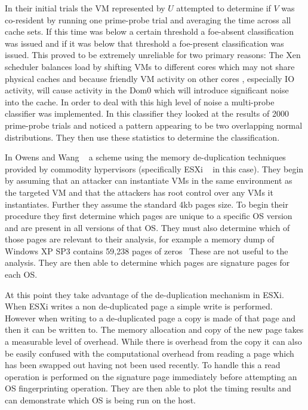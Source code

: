In their initial trials the VM represented by $U$ attempted to determine if $V$ was co-resident by running one prime-probe trial and averaging the time across all cache sets. If this time was below a certain threshold a foe-absent classification was issued and if it was below that threshold a foe-present classification was issued. This proved to be extremely unreliable for two primary reasons: The Xen scheduler balances load by shifting VMs to different cores which may not share physical caches and because friendly VM activity on other cores , especially IO activity, will cause activity in the Dom0 which will introduce significant noise into the cache. In order to deal with this high level of noise a multi-probe classifier was implemented. In this classifier they looked at the results of 2000 prime-probe trials and noticed a pattern appearing to be two overlapping normal distributions. They then use these statistics to determine the classification. 

In Owens and Wang ~\cite{owens_non-interactive_2011} a scheme using the memory de-duplication techniques provided by commodity hypervisors (specifically ESXi ~\cite{chaubal_architecture_2008} in this case). They begin by assuming that an attacker can instantiate VMs in the same environment as the targeted VM and that the attackers has root control over any VMs it instantiates. Further they assume the standard 4kb pages size. To begin their procedure they first determine which pages are unique to a specific OS version and are present in all versions of that OS. They must also determine which of those pages are relevant to their analysis, for example a memory dump of Windows XP SP3 contains 59,238 pages of zeros~\cite{owens_non-interactive_2011} These are not useful to the analysis. They are then able to determine which pages are signature pages for each OS. 

At this point they take advantage of the de-duplication mechanism in ESXi. When ESXi writes a non de-duplicated page a simple write is performed. However when writing to a de-duplicated page a copy is made of that page and then it can be written to. The memory allocation and copy of the new page takes a measurable level of overhead. While there is overhead from the copy it can also be easily confused with the computational overhead from reading a page which has been swapped out having not been used recently. To handle this a read operation is performed on the signature page immediately before attempting an OS fingerprinting operation. They are then able to plot the timing results and can demonstrate which OS is being run on the host. 

